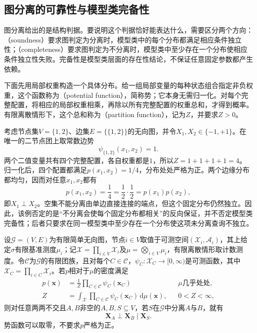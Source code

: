 \subsection{图分离的可靠性与模型类完备性}
\label{sec:pgm-undirected-separation-soundness-completeness}

图分离给出的是结构判据。要说明这个判据恰好能表达什么，需要区分两个方向：（soundness）要求图判定为分离时，模型类中的每个分布都满足相应条件独立性；（completeness）要求图判定为不分离时，模型类中至少存在一个分布使相应条件独立性失败。完备性是模型类层面的存在性结论，不保证任意固定参数都产生依赖。

下面先用局部权重构造一个具体分布。给一组局部变量的每种状态组合指定非负权重，这个函数称为（potential function），简称势；它本身无需归一化。对每个完整配置，将相应的局部权重相乘，再除以所有完整配置的权重总和，才得到概率。有限离散情形下，这个总和称为（partition function），记为$Z$，并要求$Z>0$。

\begin{example}[不分离不强迫固定分布相关]
  \label{ex:pgm-undirected-fixed-distribution-extra-independence}
  考虑节点集$V=\{1,2\}$、边集$E=\{\{1,2\}\}$的无向图，并令$X_1,X_2\in\{-1,+1\}$。在唯一的二节点团上取常数边势
  \[
    \psi_{\{1,2\}}(x_1,x_2)=1.
  \]
  两个二值变量共有四个完整配置，各自权重都是$1$，所以$Z=1+1+1+1=4$。归一化后，四个配置都满足$p(x_1,x_2)=1/4$，分布处处严格为正。两个边缘分布都均匀，因而对任意$x_1,x_2$都有
  \[
    p(x_1,x_2)=\frac14
    =\frac12\cdot\frac12
    =p(x_1)p(x_2),
  \]
  即$X_1\perp X_2$。空集不能分离由单边直接连接的端点，但这个固定分布仍然独立。因此，该例否定的是“不分离会使每个固定分布都相关”的反向保证，并不否定模型类完备性；后者只要求在同一模型类中至少存在一个分布使这项未分离查询不独立。
\end{example}

\begin{theorem}[团因子分解分布上的分离可靠性]
  \label{thm:pgm-undirected-factorization-to-global}
  设$\mathcal{G}=(V,E)$为有限简单无向图，节点$i\in V$取值于可测空间$(\mathcal{X}_i,\mathcal{A}_i)$，其上给定$\sigma$有限基准测度$\mu_i$；记$\mathcal{X}=\prod_{i\in V}\mathcal{X}_i$及$\mu=\bigotimes_{i\in V}\mu_i$，有限离散情形取计数测度。令$\mathcal{C}$为$\mathcal{G}$的有限团族，且对每个$C\in\mathcal{C}$，$\psi_C:\mathcal{X}_C\to[0,\infty)$是可测函数，其中$\mathcal{X}_C=\prod_{i\in C}\mathcal{X}_i$。若$p$相对于$\mu$的密度满足
  \[
    \begin{aligned}
      p(\bm{x})
      &=\frac{1}{Z}\prod_{C\in\mathcal{C}}\psi_C(\bm{x}_C)
        &&\text{$\mu$几乎处处},\\
      Z
      &=\int_{\mathcal{X}}\prod_{C\in\mathcal{C}}
        \psi_C(\bm{x}_C)\,\mathrm{d}\mu(\bm{x}),
        &&0<Z<\infty,
    \end{aligned}
  \]
  则对任意两两不交且$A,B$非空的$A,B,S\subseteq V$，若$S$在$\mathcal{G}$中分离$A$与$B$，就有
  \[
    \bm{X}_A\perp\bm{X}_B\mid\bm{X}_S.
  \]
  势函数可以取零，不要求$p$严格为正。
\end{theorem}

